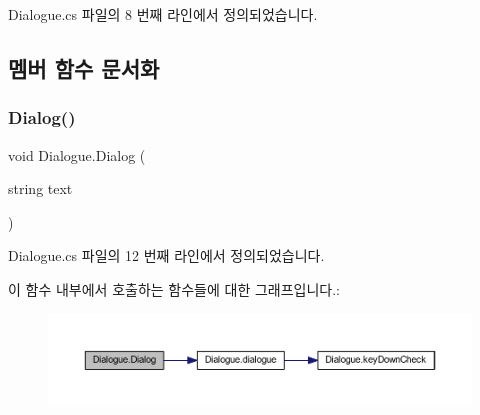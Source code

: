 Dialogue.\+cs 파일의 8 번째 라인에서 정의되었습니다.


\begin{DoxyCode}{0}

\end{DoxyCode}


\subsection{멤버 함수 문서화}
\mbox{\label{class_dialogue_ae229890e6405d952e2776a4d5410e29b}} 
\subsubsection{\texorpdfstring{Dialog()}{Dialog()}}
{\footnotesize\ttfamily void Dialogue.\+Dialog (\begin{DoxyParamCaption}\item[{string}]{text }\end{DoxyParamCaption})}



Dialogue.\+cs 파일의 12 번째 라인에서 정의되었습니다.


\begin{DoxyCode}{0}

\end{DoxyCode}
이 함수 내부에서 호출하는 함수들에 대한 그래프입니다.\+:\nopagebreak
\begin{figure}[H]
\begin{center}
\leavevmode
\includegraphics[width=350pt]{d0/d9d/class_dialogue_ae229890e6405d952e2776a4d5410e29b_cgraph}
\end{center}
\end{figure}
\mbox{\label{class_dialogue_af18f0f9a1ab343d1c870f63e05b765a6}} 
